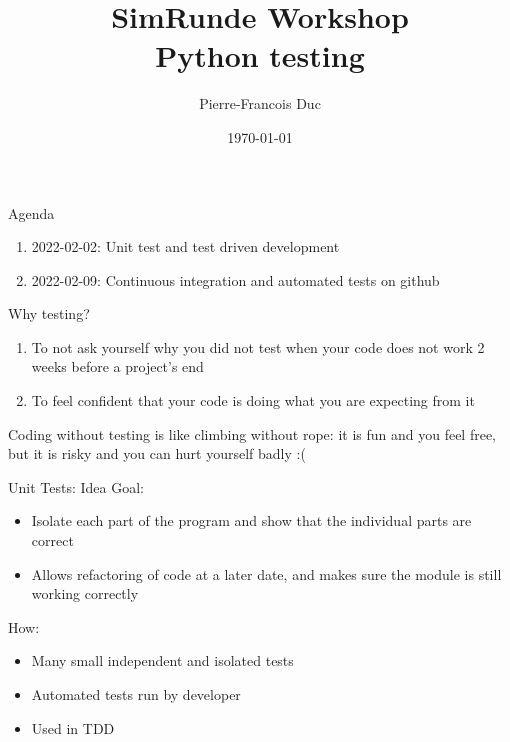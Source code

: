\documentclass{beamer}
\title[Yo]{\textbf{SimRunde Workshop} \\ Python testing}
\author{Pierre-Francois Duc\\
}
\institute{Reiner Lemoine Institut}
\date{\today}
\begin{document}
\begin{frame}
  \titlepage
\end{frame}

\begin{frame}{Agenda}
 \begin{enumerate}
  \item 2022-02-02: Unit test and test driven development
  \item 2022-02-09: Continuous integration and automated tests on github
 \end{enumerate}

\end{frame}

\begin{frame}{Why testing?}
 \begin{enumerate}
  \item To not ask yourself why you did not test when your code does not work 2 weeks before a project's end
  \item To feel confident that your code is doing what you are expecting from it
 \end{enumerate}

 Coding without testing is like climbing without rope: it is fun and you feel free, but it is risky and you can hurt yourself badly :(
 
\end{frame}

\begin{frame}{Unit Tests: Idea}
Goal:
\begin{itemize}
\item Isolate each part of the program and show that the individual parts are correct
\item Allows refactoring of code at a later date, and makes sure the module is still working correctly
\end{itemize}
How:
\begin{itemize}
\item Many small independent and isolated tests
\item Automated tests run by developer
\item Used in TDD
\end{itemize}
\end{frame}
\end{document}

